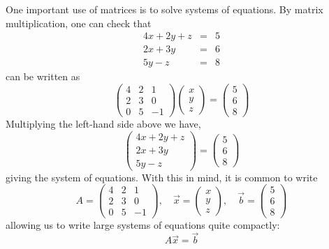 \documentclass{ximera}
\begin{document}
One important use of matrices is to solve systems of equations. By matrix multiplication, one can check that
\begin{eqnarray*}
4x+2y+z &=& 5\\
2x+3y &=& 6\\
5y -z &=& 8
\end{eqnarray*}
can be written as
\[
\begin{pmatrix}
4 & 2 & 1 \\
2 & 3 & 0\\
0 & 5 & -1
\end{pmatrix}
\begin{pmatrix}
x \\
y\\
z
\end{pmatrix}
= \begin{pmatrix}
5 \\
6\\
8
\end{pmatrix}
\]
Multiplying the left-hand side above we have,
\[
\begin{pmatrix}
4x+2y+z\\
2x+3y\\
5y-z
\end{pmatrix} = \begin{pmatrix}
5\\
6\\
8
\end{pmatrix}
\]
giving the system of equations. With this in mind, it is common to write
\[
A = \begin{pmatrix}
4 & 2 & 1 \\
2 & 3 & 0\\
0 & 5 & -1
\end{pmatrix},\quad\vec x = \begin{pmatrix} x \\ y \\ z\end{pmatrix},
  \quad\vec b = \begin{pmatrix} 5 \\6\\8\end{pmatrix}
\]
allowing us to write large systems of equations quite compactly:
\[
A\vec{x} = \vec{b}
\]
\end{document}
